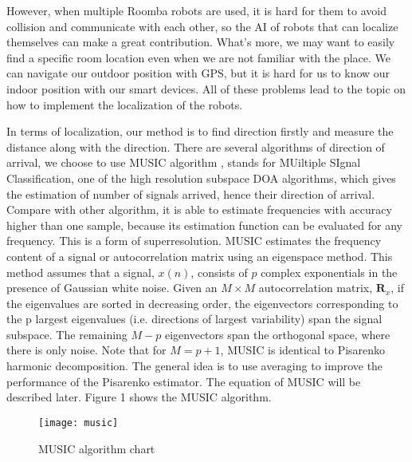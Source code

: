 	However, when multiple Roomba robots are used, it is hard for them to avoid collision and communicate with each other, so the AI of robots that can localize themselves can make a great contribution. What's more, we may want to easily find a specific room location even when we are not familiar with the place.  We can navigate our outdoor position with GPS, but it is hard for us to know our indoor position with our smart devices. All of these problems lead to the topic on how to implement the localization of the robots.
\par
	In terms of localization, our method is to find direction firstly and measure the distance along with the direction. There are several algorithms of direction of arrival, we choose to use MUSIC algorithm , stands for MUiltiple SIgnal Classification, one of the high resolution subspace DOA algorithms, which gives the estimation of number of signals arrived, hence their direction of arrival. Compare with other algorithm, it is able to estimate frequencies with accuracy higher than one sample, because its estimation function can be evaluated for any frequency. This is a form of superresolution. MUSIC estimates the frequency content of a signal or autocorrelation matrix using an eigenspace method. This method assumes that a signal, $x(n)$, consists of $p$ complex exponentials in the presence of Gaussian white noise. Given an $M \times M$ autocorrelation matrix, $\mathbf{R}_x$, if the eigenvalues are sorted in decreasing order, the eigenvectors corresponding to the p largest eigenvalues (i.e. directions of largest variability) span the signal subspace. The remaining $M-p$ eigenvectors span the orthogonal space, where there is only noise. Note that for $M = p + 1$, MUSIC is identical to Pisarenko harmonic decomposition. The general idea is to use averaging to improve the performance of the Pisarenko estimator. The equation of MUSIC will be described later. Figure 1 shows the MUSIC algorithm. \cite{wiki:MUSIC} \cite{music}
	\begin{figure}[ht]
	\centering
	\texttt{[image: music]}
	\caption{MUSIC algorithm chart}
	\end{figure}
	
